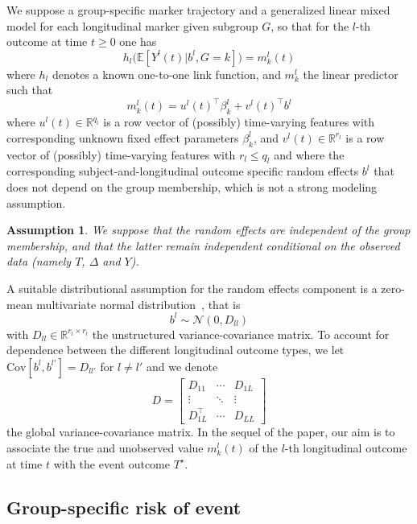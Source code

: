 \documentclass[11pt]{article}
\newtheorem{assumption}{Assumption}{\bf}{\rm}
\newcommand{\cN}{\mathcal N}
\newcommand{\R}{\mathds R}
\newcommand{\E}{\mathds E}
\begin{document}
We suppose a group-specific marker trajectory and a generalized linear mixed model for each longitudinal marker given subgroup $G$, so that for the $l$-th outcome at time $t \geq 0$ one has
\begin{equation}
	\label{eq:link-function}
 	h_l\big(\E[Y^l(t)|b^l, G=k]\big) = m_k^l(t)
 \end{equation}
where $h_l$ denotes a known one-to-one link function, and $m_k^l$ the linear predictor such that
\[ m_k^l(t) = u^l(t)^\top\beta_k^l + v^l(t)^\top b^l \]
where $u^l(t) \in \R^{q_l}$ is a row vector of (possibly) time-varying features with corresponding unknown fixed effect parameters $\beta_k^l$, and $v^l(t) \in \R^{r_l}$ is a row vector of (possibly) time-varying features with $r_l \leq q_l$ and where the corresponding subject-and-longitudinal outcome specific random effects $b^l$ that does not depend on the group membership, which is not a strong modeling assumption.
\begin{assumption}
\label{assumption1}
We suppose that the random effects are independent of the group membership, and that the latter remain independent conditional on the observed data (namely $T$, $\Delta$ and $Y$).
\end{assumption}
A suitable distributional assumption for the random effects component is a zero-mean multivariate normal distribution~\citep{hickey2016joint}, that is
\begin{equation}
   \label{eq:random-effect-law}
   b^l \sim \cN(0, D_{ll})
 \end{equation} 
with $D_{ll} \in \R^{r_l \times r_l}$ the unstructured variance-covariance matrix. 
To account for dependence between the different longitudinal outcome types, we let $\text{Cov}[b^l,b^{l'}] = D_{ll'}$ for $l \ne l'$ and we denote
\[ D = 
\begin{bmatrix}
  D_{11} & \cdots & D_{1L}\\
  \vdots &  \ddots & \vdots \\
  D_{1L}^\top & \cdots & D_{LL}
\end{bmatrix}
\]
the global variance-covariance matrix.
In the sequel of the paper, our aim is to associate the true and unobserved value $m_k^l(t)$ of the $l$-th longitudinal outcome at time $t$ with the event outcome $T^\star$.

\subsection{Group-specific risk of event}
\end{document}
